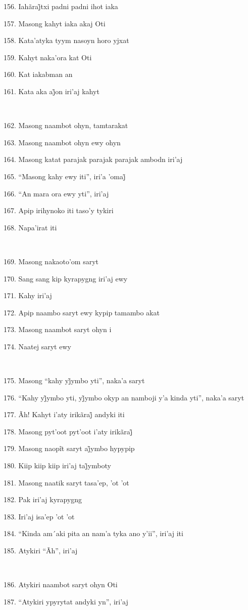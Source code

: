 156. Iahãraj̃txi padni padni ihot iaka

157. Masong kahyt iaka akaj Oti

158. Kata'atyka tyym nasoyn horo yjxat

159. Kahyt naka'ora kat Oti

160. Kat iakabman an

161. Kata aka aj̃on iri’aj kahyt

~

162. Masong naambot ohyn, tamtarakat

163. Masong naambot ohyn ewy ohyn

164. Masong katat parajak parajak parajak ambodn iri'aj

165. ``Masong kahy ewy iti'', iri’a ’omaj̃

166. ``An mara ora ewy yti'', iri'aj

167. Apip irihynoko iti taso'y tykiri

168. Napa'irat iti

~

169. Masong nakaoto'om saryt

170. Sang sang kip kyrapygng iri'aj ewy

171. Kahy iri'aj

172. Apip naambo saryt ewy kypip tamambo akat

173. Masong naambot saryt ohyn i

174. Naatej saryt ewy

~

175. Masong ``kahy yj̃ymbo yti'', naka’a saryt

176. ``Kahy yj̃ymbo yti, yj̃ymbo okyp an namboji y’a kinda yti'', naka’a saryt

177. Ãh! Kahyt i’aty irikãraj̃ andyki iti

178. Masong pyt’oot pyt’oot i’aty irikãraj̃

179. Masong naopĩt saryt aj̃ymbo hypypip

180. Kiip kiip kiip iri’aj taj̃ymboty

181. Masong naatik saryt tasa'ep, 'ot 'ot

182. Pak iri'aj kyrapygng

183. Iri'aj isa'ep 'ot 'ot

184. ``Kinda am´aki pita an nam'a tyka ano y'ii'', iri'aj iti

185. Atykiri ``Ãh'', iri'aj

~

186. Atykiri naambot saryt ohyn Oti

187. ``Atykiri ypyrytat andyki yn'', iri'aj


